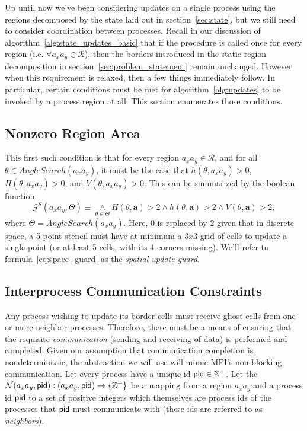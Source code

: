 Up until now we've been considering updates on a
single process using the regions decomposed by the
state
laid out in section~\ref{sec:state}, but we still
need to consider coordination between processes.
Recall in our discussion of algorithm~\ref{alg:state_updates_basic} that if the procedure is called
once for every region (i.e. $\forall a_xa_y \in \mathcal{R}$), then the borders introduced in the static
region decomposition in section~\ref{sec:problem_statement} remain unchanged.  However when this requirement
is relaxed, then a few things immediately follow.  In
particular, certain conditions must be met for
algorithm~\ref{alg:updates} to be invoked by a
process region at all.  This
section enumerates those conditions.

\subsection{Nonzero Region Area}

This first such condition is that for every region $a_xa_y \in \mathcal{R}$, and for all
$\theta\in AngleSearch(a_xa_y)$, it must be the case that $h(\theta,a_xa_y) > 0$,
$H(\theta,a_xa_y) > 0$, and $V(\theta,a_xa_y) > 0$.  This can be summarized by the
boolean function,
\begin{equation}
    \mathcal{G}^S(a_xa_y,\Theta) \equiv \underset{\theta \in \Theta}{\wedge}
    H(\theta,\mathbf{a}) > 2 \wedge
    h(\theta,\mathbf{a}) > 2 \wedge
    V(\theta,\mathbf{a}) > 2,
    \label{eq:space_guard}
\end{equation}
where $\Theta = AngleSearch(a_xa_y)$.
Here, $0$ is replaced by $2$ given that in discrete space, a 5 point stencil must have at
minimum a $3x3$ grid of cells to update a single point
(or at least 5 cells, with its 4 corners missing).  We'll refer to formula~\ref{eq:space_guard}
as the {\it spatial update guard}.

\subsection{Interprocess Communication Constraints}

Any process wishing to update its border cells must receive ghost
cells from one or more neighbor processes.
Therefore, there must be a means of ensuring that the requisite
{\it communication} (sending and receiving of data) is performed
and completed.
Given our assumption that communication completion is nondeterministic, the abstraction
we will use will mimic MPI's non-blocking communication.  Let
every process have a unique id $\textup{\textsf{pid}} \in \mathbb{Z}^+$.  Let
the $\mathcal{N}(a_xa_y,\textup{\textsf{pid}}): (a_xa_y,\textup{\textsf{pid}}) \rightarrow \{\mathbb{Z}^+\}$ be a mapping
from a region $a_xa_y$ and a process id $\textup{\textsf{pid}}$ to a set of positive
integers which themselves are process ids of the processes that
$\textup{\textsf{pid}}$ must communicate with (these ids are referred to as {\it neighbors}).

